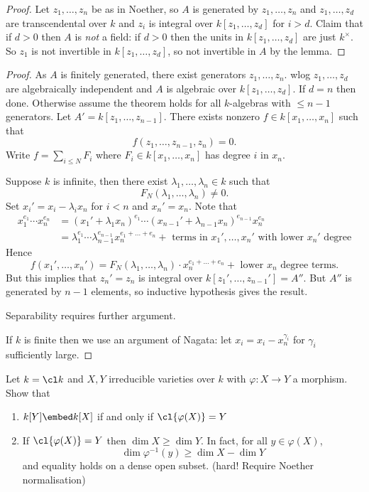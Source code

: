 \documentclass[a4paper]{article}
\begin{document}
\begin{proof}
  Let \(z_1, \dots, z_n\) be as in Noether, so \(A\) is generated by \(z_1, \dots, z_n\) and \(z_1, \dots, z_d\) are transcendental over \(k\) and \(z_i\) is integral over \(k[z_1, \dots, z_d]\) for \(i > d\). Claim that if \(d > 0\) then \(A\) is \emph{not} a field: if \(d > 0\) then the units in \(k[z_1, \dots, z_d]\) are just \(k^\times\). So \(z_1\) is not invertible in \(k[z_1, \dots, z_d]\), so not invertible in \(A\) by the lemma.
\end{proof}

\begin{proof}
  As \(A\) is finitely generated, there exist generators \(z_1, \dots, z_n\). wlog \(z_1, \dots, z_d\) are algebraically independent and \(A\) is algebraic over \(k[z_1, \dots, z_d]\). If \(d = n\) then done. Otherwise assume the theorem holds for all \(k\)-algebras with \(\leq n - 1\) generators. Let \(A' = k[z_1, \dots, z_{n - 1}]\). There exists nonzero \(f \in k[x_1, \dots, x_n]\) such that
  \[
    f(z_1, \dots, z_{n - 1}, z_n) = 0.
  \]
  Write \(f = \sum_{i \leq N} F_i\) where \(F_i \in k[x_1, \dots, x_n]\) has degree \(i\) in \(x_n\).

  Suppose \(k\) is infinite, then there exist \(\lambda_1, \dots, \lambda_n \in k\) such that
  \[
    F_N(\lambda_1, \dots, \lambda_n) \neq 0.
  \]
  Set \(x_i' = x_i - \lambda_i x_n\) for \(i < n\) and \(x_n' = x_n\). Note that
  \begin{align*}
    x_1^{e_1} \cdots x_n^{e_n}
    &= (x_1' + \lambda_1 x_n)^{e_1} \cdots (x_{n - 1}' + \lambda_{n - 1} x_n)^{e_{n - 1}} x_n^{e_n} \\
    &= \lambda_1^{e_1} \cdots \lambda_{n - 1}^{e_{n - 1}} x_n^{e_1 + \dots + e_n} + \text{ terms in \(x_1', \dots, x_n'\) with lower \(x_n'\) degree}
  \end{align*}
  Hence
  \[
    f(x_1', \dots, x_n') = F_N(\lambda_1, \dots, \lambda_n) \cdot x_n^{e_1 + \dots + e_n} + \text{ lower \(x_n\) degree terms}.
  \]
  But this implies that \(z_n' = z_n\) is integral over \(k[z_1', \dots, z_{n - 1}'] = A''\). But \(A''\) is generated by \(n - 1\) elements, so inductive hypothesis gives the result.

  Separability requires further argument.

  If \(k\) is finite then we use an argument of Nagata: let \(x_i = x_i - x_n^{\gamma_i}\) for \(\gamma_i\) sufficiently large.
\end{proof}

\begin{ex}
  Let \(k = \cl k\) and \(X, Y\) irreducible varieties over \(k\) with \(\varphi: X \to Y\) a morphism. Show that
  \begin{enumerate}
  \item \(k[Y] \embed k[X]\) if and only if \(\cl{\varphi(X)} = Y\)
  \item If \(\cl{\varphi(X)} = Y\) then \(\dim X \geq \dim Y\). In fact, for all \(y \in \varphi(X)\),
    \[
      \dim \varphi^{-1}(y) \geq \dim X - \dim Y
    \]
    and equality holds on a dense open subset. (hard! Require Noether normalisation)
  \end{enumerate}
\end{ex}
\end{document}
